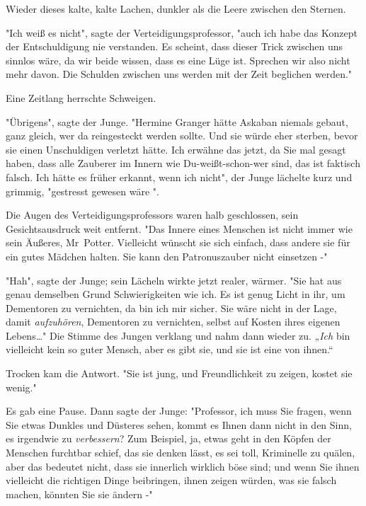 {Wieder dieses kalte, kalte Lachen, dunkler als die Leere zwischen den Sternen.

"Ich weiß es nicht", sagte der Verteidigungsprofessor, "auch ich habe das Konzept der Entschuldigung nie verstanden. Es scheint, dass dieser Trick zwischen uns sinnlos wäre, da wir beide wissen, dass es eine Lüge ist. Sprechen wir also nicht mehr davon. Die Schulden zwischen uns werden mit der Zeit beglichen werden."

Eine Zeitlang herrschte Schweigen.

"Übrigens", sagte der Junge. "Hermine Granger hätte Askaban niemals gebaut, ganz gleich, wer da reingesteckt werden sollte. Und sie würde eher sterben, bevor sie einen Unschuldigen verletzt hätte. Ich erwähne das jetzt, da Sie mal gesagt haben, dass alle Zauberer im Innern wie Du-weißt-schon-wer sind, das ist faktisch falsch. Ich hätte es früher erkannt, wenn ich nicht", der Junge lächelte kurz und grimmig, "gestresst gewesen wäre ".

Die Augen des Verteidigungsprofessors waren halb geschlossen, sein Gesichtsausdruck weit entfernt. "Das Innere eines Menschen ist nicht immer wie sein Äußeres, Mr~Potter. Vielleicht wünscht sie sich einfach, dass andere sie für ein gutes Mädchen halten. Sie kann den Patronuszauber nicht einsetzen -"

"Hah", sagte der Junge; sein Lächeln wirkte jetzt realer, wärmer. "Sie hat aus genau demselben Grund Schwierigkeiten wie ich. Es ist genug Licht in ihr, um Dementoren zu vernichten, da bin ich mir sicher. Sie wäre nicht in der Lage, damit \emph{aufzuhören}, Dementoren zu vernichten, selbst auf Kosten ihres eigenen Lebens…" Die Stimme des Jungen verklang und nahm dann wieder zu. „\emph{Ich} bin vielleicht kein so guter Mensch, aber es gibt sie, und sie ist eine von ihnen.“

Trocken kam die Antwort. "Sie ist jung, und Freundlichkeit zu zeigen, kostet sie wenig."

Es gab eine Pause. Dann sagte der Junge: "Professor, ich muss Sie fragen, wenn Sie etwas Dunkles und Düsteres sehen, kommt es Ihnen dann nicht in den Sinn, es irgendwie zu \emph{verbessern}? Zum Beispiel, ja, etwas geht in den Köpfen der Menschen furchtbar schief, das sie denken lässt, es sei toll, Kriminelle zu quälen, aber das bedeutet nicht, dass sie innerlich wirklich böse sind; und wenn Sie ihnen vielleicht die richtigen Dinge beibringen, ihnen zeigen würden, was sie falsch machen, könnten Sie sie ändern -"

}
